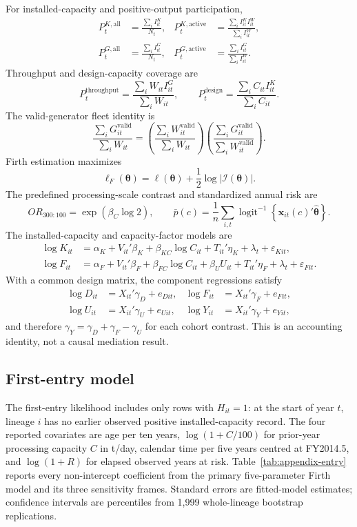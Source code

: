 \documentclass[12pt,letterpaper]{article}
\begin{document}
For installed-capacity and positive-output participation,
\begin{align*}
P_t^{K,\mathrm{all}}&=\frac{\sum_i I_{it}^{K}}{N_t}, &
P_t^{K,\mathrm{active}}&=\frac{\sum_i I_{it}^{K}I_{it}^{W}}{\sum_i I_{it}^{W}},\\
P_t^{G,\mathrm{all}}&=\frac{\sum_i I_{it}^{G}}{N_t}, &
P_t^{G,\mathrm{active}}&=\frac{\sum_i I_{it}^{G}}{\sum_i I_{it}^{W}}.
\end{align*}
Throughput and design-capacity coverage are
\[
P_t^{\mathrm{throughput}}=\frac{\sum_i W_{it}I_{it}^{G}}{\sum_i W_{it}},
\qquad
P_t^{\mathrm{design}}=\frac{\sum_i C_{it}I_{it}^{K}}{\sum_i C_{it}}.
\]
The valid-generator fleet identity is
\[
\frac{\sum_i G_{it}^{\mathrm{valid}}}{\sum_i W_{it}}
=\left(\frac{\sum_i W_{it}^{\mathrm{valid}}}{\sum_i W_{it}}\right)
\left(\frac{\sum_i G_{it}^{\mathrm{valid}}}{\sum_i W_{it}^{\mathrm{valid}}}\right).
\]
Firth estimation maximizes
\[
\ell_F(\boldsymbol{\theta})=\ell(\boldsymbol{\theta})+
\frac{1}{2}\log\left|\mathcal{I}(\boldsymbol{\theta})\right|.
\]
The predefined processing-scale contrast and standardized annual risk are
\[
OR_{300:100}=\exp(\beta_C\log 2),\qquad
\bar p(c)=\frac{1}{n}\sum_{i,t}
\operatorname{logit}^{-1}\!\left\{\mathbf{x}_{it}(c)'
\hat{\boldsymbol\theta}\right\}.
\]
The installed-capacity and capacity-factor models are
\begin{align*}
\log K_{it}&=\alpha_K+V_{it}'\beta_K+\beta_{KC}\log C_{it}
+T_{it}'\eta_K+\lambda_t+\varepsilon_{Kit},\\
\log F_{it}&=\alpha_F+V_{it}'\beta_F+\beta_{FC}\log C_{it}
+\beta_U U_{it}+T_{it}'\eta_F+\lambda_t+\varepsilon_{Fit}.
\end{align*}
With a common design matrix, the component regressions satisfy
\begin{align*}
\log D_{it}&=X_{it}'\gamma_D+e_{Dit}, &
\log F_{it}&=X_{it}'\gamma_F+e_{Fit},\\
\log U_{it}&=X_{it}'\gamma_U+e_{Uit}, &
\log Y_{it}&=X_{it}'\gamma_Y+e_{Yit},
\end{align*}
and therefore $\gamma_Y=\gamma_D+\gamma_F-\gamma_U$ for each cohort
contrast. This is an accounting identity, not a causal mediation result.

\subsection{First-entry model}

The first-entry likelihood includes only rows with $H_{it}=1$: at the start of
year $t$, lineage $i$ has no earlier observed positive installed-capacity
record. The four reported covariates are age per ten years,
$\log(1+C/100)$ for prior-year processing capacity $C$ in t/day, calendar time
per five years centred at FY2014.5, and $\log(1+R)$ for elapsed observed years
at risk. Table~\ref{tab:appendix-entry} reports every non-intercept coefficient
from the primary five-parameter Firth model and its three sensitivity frames.
Standard errors are fitted-model estimates; confidence intervals are
percentiles from 1,999 whole-lineage bootstrap replications.
\end{document}
